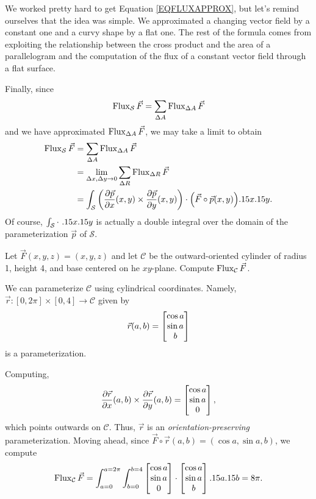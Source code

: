 We worked pretty hard to get Equation \eqref{EQFLUXAPPROX}, but
let's remind ourselves that the idea was simple.  We approximated
a changing vector field by a constant one and a curvy shape by a flat one.
The rest of the formula comes from exploiting the relationship between
the cross product and the area of a parallelogram and the computation
of the flux of a constant vector field through a flat surface.

Finally, since 
\[
	\operatorname{Flux}_{\mathcal S} \vec F = \sum_{\Delta A} \operatorname{Flux}_{\Delta A} \vec F
\]
and we have approximated $\operatorname{Flux}_{\Delta A}\vec F$, we may take a limit to obtain
\begin{align*}
	\operatorname{Flux}_{\mathcal S} \vec F &= \sum_{\Delta A} \operatorname{Flux}_{\Delta A} \vec F\\
	&=\lim_{\Delta x,\Delta y\to 0} \sum_{\Delta R} \operatorname{Flux}_{\Delta R} \vec F\\
	&= \int_{\mathcal S} 
	\left(\frac{\partial \vec p}{\partial x}(x,y) \times
	\frac{\partial \vec p}{\partial y}(x,y)\right)
	\cdot \Big(\vec F\circ \vec p(x,y)\Big ).15 x.15 y.
\end{align*}
Of course, $\int_{\mathcal S}\cdot\ .15 x.15 y$ is actually a double integral
over the domain of the parameterization $\vec p$ of $\mathcal S$.

\begin{example}
	Let $\vec F(x,y,z)=(x,y,z)$ and let $\mathcal C$ be the outward-oriented cylinder of radius 1,
	height 4, and base centered on he $xy$-plane.  Compute $\operatorname{Flux}_{\mathcal C}\vec F$.

	We can parameterize $\mathcal C$ using cylindrical coordinates.  Namely,
	$\vec r:[0,2\pi]\times[0,4]\to\mathcal C$ given by
	\[
		\vec r(a,b) = \begin{bmatrix}\cos a\\\sin a\\ b\end{bmatrix}
	\]
	is a parameterization.

	Computing,
	\[
		\frac{\partial \vec r}{\partial x}(a,b) \times
		\frac{\partial \vec r}{\partial y}(a,b) = \begin{bmatrix}\cos a\\\sin a\\ 0\end{bmatrix},
	\]
	which points outwards on $\mathcal C$.  Thus, $\vec r$ is an \emph{orientation-preserving}
	parameterization.  Moving ahead, since $\vec F\circ \vec r(a,b) = (\cos a,\sin a, b)$, 
	we compute
	\[
		\operatorname{Flux}_{\mathcal C}\vec F = \int_{a=0}^{a=2\pi}\int_{b=0}^{b=4} \begin{bmatrix}\cos a\\\sin a\\ 0\end{bmatrix}\cdot
		\begin{bmatrix}\cos a\\\sin a\\ b\end{bmatrix}.15 a.15 b = 8\pi.
	\]
\end{example}

